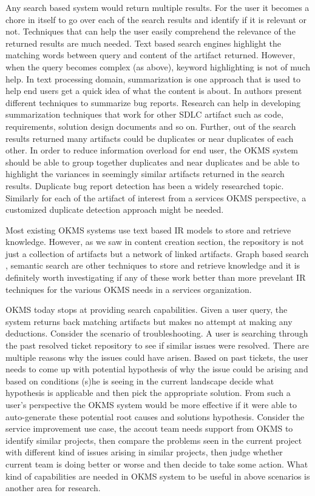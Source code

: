 Any search based system would return multiple results. For the user it becomes a chore in itself to go over each of the search results and identify if it is relevant or not. Techniques that can help the user easily comprehend the relevance of the returned results are much needed. Text based search engines highlight the matching words between query and content of the artifact returned. However, when the query becomes complex (as above), keyword highlighting is not of much help. In text processing domain, summarization is one approach that is used to help end users get a quick idea of what the content is about. In \cite{Mani:2012,Rastkar:2010} authors present different techniques to summarize bug reports. Research can help in developing summarization techniques that work for other SDLC artifact such as code, requirements, solution design documents and so on. Further, out of the search results returned many artifacts could be duplicates or near duplicates of each other. In order to reduce information overload for end user, the OKMS system should be able to group together duplicates and near duplicates and be able to highlight the variances in seemingly similar artifacts returned in the search results. Duplicate bug report detection \cite{} has been a widely researched topic. Similarly for each of the artifact of interest from a services OKMS perspective, a customized duplicate detection approach might be needed. 

Most existing OKMS systems use text based IR models to store and retrieve knowledge. However, as we saw in content creation section, the repository is not just a collection of artifacts but a network of linked artifacts. Graph based search \cite{}, semantic search \cite{} are other techniques to store and retrieve knowledge and it is definitely worth investigating if any of these work better than more prevelant IR techniques for the various OKMS needs in a services organization. 

OKMS today stops at providing search capabilities. Given a user query, the system returns back matching artifacts but makes no attempt at making any deductions. Consider the scenario of troubleshooting. A user is searching through the past resolved ticket repository to see if similar issues were resolved. There are multiple reasons why the issues could have arisen. Based on past tickets, the user needs to come up with potential hypothesis of why the issue could be arising and based on conditions (s)he is seeing in the current landscape decide what hypothesis is applicable and then pick the appropriate solution. From such a user's perspective the OKMS system would be more effective if it were able to auto-generate these potential root causes and solutions hypothesis. Consider the service improvement use case, the accout team needs support from OKMS to identify similar projects, then compare the problems seen in the current project with different kind of issues arising in similar projects, then judge whether current team is doing better or worse and then decide to take some action. What kind of capabilities are needed in OKMS system to be useful in above scenarios is another area for research. 

